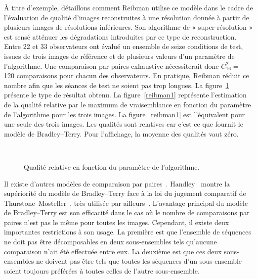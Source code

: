 À titre d'exemple, détaillons comment Reibman utilise ce modèle dans le cadre de l'évaluation de qualité d'images reconstruites à une résolution donnée à partir de plusieurs images de résolutions inférieures. Son algorithme de « super-résolution » est sensé atténuer les dégradations introduites par ce type de reconstruction. Entre 22 et 33 observateurs ont évalué un ensemble de seize conditions de test, issues de trois images de référence et de plusieurs valeurs d'un paramètre de l'algorithme. Une comparaison par paires exhaustive nécessiterait donc $C_{16}^2=$ 120 comparaisons pour chacun des observateurs. En pratique, Reibman réduit ce nombre afin que les séances de test ne soient pas trop longues. La figure~\ref{fig:reibmanVpqm2006} présente le type de résultat obtenu. La figure~\ref{reibman1} représente l'estimation de la qualité relative par le maximum de vraisemblance en fonction du paramètre de l'algorithme pour les trois images. La figure~\ref{reibman1} est l'équivalent pour une seule des trois images. Les qualités sont relatives car c'est ce que fournit le modèle de Bradley--Terry. Pour l'affichage, la moyenne des qualités vaut zéro.

\begin{figure}[htbp]
	\centering
	\\
	\caption{Qualité relative en fonction du paramètre de l'algorithme.}
	\label{fig:reibmanVpqm2006}
\end{figure}

Il existe d'autres modèles de comparaison par paires~\cite{scheffe-jasa,kendall-biometrics,morrissey-josa}. Handley~\cite{handley-pics2001} montre la supériorité du modèle de Bradley--Terry face à la loi du jugement comparatif de Thurstone--Mosteller~\cite{thurstone-psychometrika,mosteller-psychometrika1, mosteller-psychometrika2}, très utilisée par ailleurs~\cite{imberty-rsa,bradlow-jasa}. L'avantage principal du modèle de Bradley--Terry est son efficacité dans le cas où le nombre de comparaisons par paires n'est pas le même pour toutes les images. Cependant, il existe deux importantes restrictions à son usage. La première est que l'ensemble de séquences ne doit pas être décomposables en deux sous-ensembles tels qu'aucune comparaison n'ait été effectuée entre eux. La deuxième est que ces deux sous-ensembles ne doivent pas être tels que toutes les séquences d'un sous-ensemble soient toujours préférées à toutes celles de l'autre sous-ensemble.


